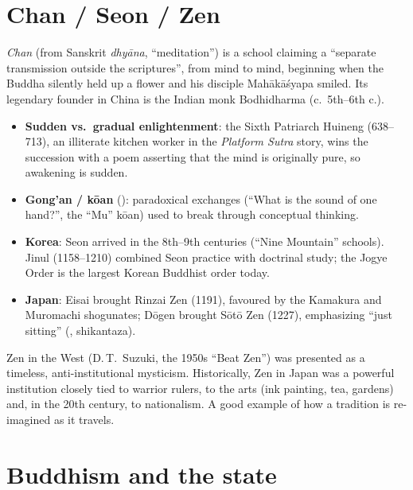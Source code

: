 \section{Chan / Seon / Zen}

\begin{definition}[Chan]
\emph{Chan} (from Sanskrit \emph{dhyāna}, ``meditation'') is a school claiming a
``separate transmission outside the scriptures'', from mind to mind, beginning when the
Buddha silently held up a flower and his disciple Mahākāśyapa smiled. Its legendary
founder in China is the Indian monk Bodhidharma (c.\ 5th--6th c.).
\end{definition}

\begin{itemize}
  \item \textbf{Sudden vs.\ gradual enlightenment}: the Sixth Patriarch Huineng (638--713),
        an illiterate kitchen worker in the \emph{Platform Sutra} story, wins the
        succession with a poem asserting that the mind is originally pure, so awakening is
        sudden.
  \item \textbf{Gong'an / kōan} (): paradoxical exchanges (``What is the sound of
        one hand?'', the ``Mu'' kōan) used to break through conceptual thinking.
  \item \textbf{Korea}: Seon arrived in the 8th--9th centuries (``Nine Mountain'' schools).
        Jinul (1158--1210) combined Seon practice with doctrinal study; the Jogye Order is
        the largest Korean Buddhist order today.
  \item \textbf{Japan}: Eisai brought Rinzai Zen (1191), favoured by the Kamakura and
        Muromachi shogunates; Dōgen brought Sōtō Zen (1227), emphasizing ``just sitting''
        (, shikantaza).
\end{itemize}

\begin{aside}
Zen in the West (D.\,T.\ Suzuki, the 1950s ``Beat Zen'') was presented as a timeless,
anti-institutional mysticism. Historically, Zen in Japan was a powerful institution closely
tied to warrior rulers, to the arts (ink painting, tea, gardens) and, in the 20th century,
to nationalism. A good example of how a tradition is re-imagined as it travels.
\end{aside}

\section{Buddhism and the state}

